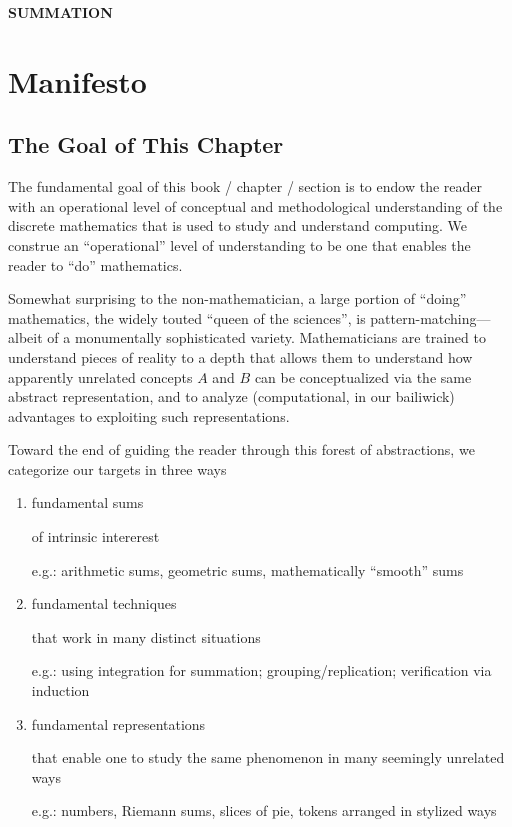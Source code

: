 \documentclass{article}
\begin{document}
\begin{center}
{\bf SUMMATION}
\end{center}


\section{Manifesto}


\subsection{The Goal of This Chapter}


The fundamental goal of this book / chapter / section is to endow the
reader with an operational level of conceptual and methodological
understanding of the discrete mathematics that is used to study and
understand computing.  We construe an ``operational'' level of
understanding to be one that enables the reader to ``do'' mathematics.

Somewhat surprising to the non-mathematician, a large portion of
``doing'' mathematics, the widely touted ``queen of the sciences'', is
pattern-matching---albeit of a monumentally sophisticated variety.
Mathematicians are trained to understand pieces of reality to a depth
that allows them to understand how apparently unrelated concepts $A$
and $B$ can be conceptualized via the same abstract representation,
and to analyze (computational, in our bailiwick) advantages to
exploiting such representations.

Toward the end of guiding the reader through this forest of
abstractions, we categorize our targets in three ways
\begin{enumerate}
\item
fundamental sums

of intrinsic intererest

e.g.: arithmetic sums, geometric sums, mathematically ``smooth'' sums

\item
fundamental techniques

that work in many distinct situations

e.g.: using integration for summation; grouping/replication; verification via induction

\item
fundamental representations

that enable one to study the same phenomenon in many seemingly unrelated ways

e.g.: numbers, Riemann sums, slices of pie, tokens arranged in stylized ways
\end{enumerate}
\end{document}
